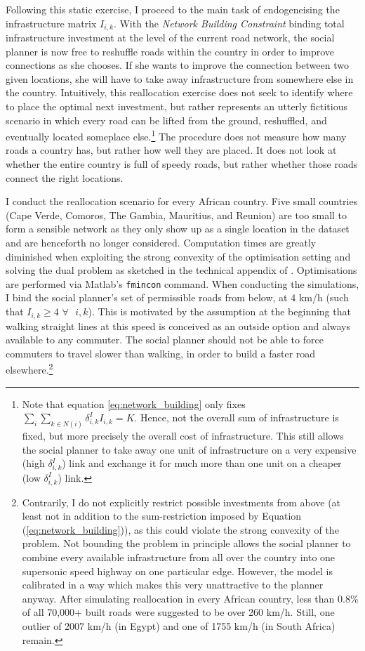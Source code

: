 \documentclass[11pt, oneside]{article}   	%
\let\oldref\ref
\renewcommand{\ref}[1]{(\oldref{#1})}
\begin{document}
Following this static exercise, I proceed to the main task of endogeneising the infrastructure matrix $I_{i,k}$. With the \emph{Network Building Constraint} binding total infrastructure investment at the level of the current road network, the social planner is now free to reshuffle roads within the country in order to improve connections as she chooses. If she wants to improve the connection between two given locations, she will have to take away infrastructure from somewhere else in the country. Intuitively, this reallocation exercise does not seek to identify where to place the optimal next investment, but rather represents an utterly fictitious scenario in which every road can be lifted from the ground, reshuffled, and eventually located someplace else.\footnote{Note that equation \eqref{eq:network_building} only fixes $\sum_{i}^{}\sum_{k \in N(i)}^{} \delta_{i,k}^{I}I_{i,k} = K$. Hence, not the overall sum of infrastructure is fixed, but more precisely the overall cost of infrastructure. This still allows the social planner to take away one unit of infrastructure on a very expensive (high $\delta_{i,k}^{I}$) link and exchange it for much more than one unit on a cheaper (low $\delta_{i,k}^{I}$) link.} The procedure does not measure how many roads a country has, but rather how well they are placed. It does not look at whether the entire country is full of speedy roads, but rather whether those roads connect the right locations.

I conduct the reallocation scenario for every African country. Five small countries (Cape Verde, Comoros, The Gambia, Mauritius, and Reunion) are too small to form a sensible network as they only show up as a single location in the dataset and are henceforth no longer considered. Computation times are greatly diminished when exploiting the strong convexity of the optimisation setting and solving the dual problem as sketched in the technical appendix of \cite{fajgelbaum_optimal_2017}. Optimisations are performed via Matlab's \texttt{fmincon} command. When conducting the simulations, I bind the social planner's set of permissible roads from below, at 4 km/h (such that $I_{i,k} \geq 4$ $ \forall \textrm{ } i,k$). This is motivated by the assumption at the beginning that walking straight lines at this speed is conceived as an outside option and always available to any commuter. The social planner should not be able to force commuters to travel slower than walking, in order to build a faster road elsewhere.\footnote{Contrarily, I do not explicitly restrict possible investments from above (at least not in addition to the sum-restriction imposed by Equation \ref{eq:network_building}), as this could violate the strong convexity of the problem. Not bounding the problem in principle allows the social planner to combine every available infrastructure from all over the country into one supersonic speed highway on one particular edge. However, the model is calibrated in a way which makes this very unattractive to the planner anyway. After simulating reallocation in every African country, less than 0.8\% of all 70,000+ built roads were suggested to be over 260 km/h. Still, one outlier of 2007 km/h (in Egypt) and one of 1755 km/h (in South Africa) remain.}
\end{document}
